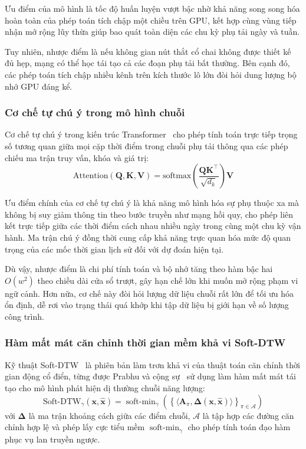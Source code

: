 Ưu điểm của mô hình là tốc độ huấn luyện vượt bậc nhờ khả năng song song hóa hoàn toàn của phép toán tích chập một chiều trên GPU, kết hợp cùng vùng tiếp nhận mở rộng lũy thừa giúp bao quát toàn diện các chu kỳ phụ tải ngày và tuần.

Tuy nhiên, nhược điểm là nếu không gian nút thắt cổ chai không được thiết kế đủ hẹp, mạng có thể học tái tạo cả các đoạn phụ tải bất thường. Bên cạnh đó, các phép toán tích chập nhiều kênh trên kích thước lô lớn đòi hỏi dung lượng bộ nhớ GPU đáng kể.

\subsubsection{Cơ chế tự chú ý trong mô hình chuỗi}

Cơ chế tự chú ý trong kiến trúc Transformer~\cite{transformer} cho phép tính toán trực tiếp trọng số tương quan giữa mọi cặp thời điểm trong chuỗi phụ tải thông qua các phép chiếu ma trận truy vấn, khóa và giá trị:
\begin{equation*}
    \text{Attention}(\mathbf{Q}, \mathbf{K}, \mathbf{V}) = \text{softmax}\left( \frac{\mathbf{Q}\mathbf{K}^\top}{\sqrt{d_k}} \right) \mathbf{V}
\end{equation*}

Ưu điểm chính của cơ chế tự chú ý là khả năng mô hình hóa sự phụ thuộc xa mà không bị suy giảm thông tin theo bước truyền như mạng hồi quy, cho phép liên kết trực tiếp giữa các thời điểm cách nhau nhiều ngày trong cùng một chu kỳ vận hành. Ma trận chú ý đồng thời cung cấp khả năng trực quan hóa mức độ quan trọng của các mốc thời gian lịch sử đối với dự đoán hiện tại.

Dù vậy, nhược điểm là chi phí tính toán và bộ nhớ tăng theo hàm bậc hai $O(w^2)$ theo chiều dài cửa sổ trượt, gây hạn chế lớn khi muốn mở rộng phạm vi ngữ cảnh. Hơn nữa, cơ chế này đòi hỏi lượng dữ liệu chuỗi rất lớn để tối ưu hóa ổn định, dễ rơi vào trạng thái quá khớp khi tập dữ liệu bị giới hạn về số lượng công trình.

\subsubsection{Hàm mất mát căn chỉnh thời gian mềm khả vi Soft-DTW}

Kỹ thuật Soft-DTW~\cite{soft_dtw} là phiên bản làm trơn khả vi của thuật toán căn chỉnh thời gian động cổ điển, từng được Prabhu và cộng sự~\cite{prabhu2024} sử dụng làm hàm mất mát tái tạo cho mô hình phát hiện dị thường chuỗi năng lượng:
\begin{equation*}
    \text{Soft-DTW}_\gamma(\mathbf{x}, \hat{\mathbf{x}}) = \operatorname{soft-min}_\gamma \left( \left\{ \langle \mathbf{A}_\pi, \boldsymbol{\Delta}(\mathbf{x}, \hat{\mathbf{x}}) \rangle \right\}_{\pi \in \mathcal{A}} \right)
\end{equation*}
với $\boldsymbol{\Delta}$ là ma trận khoảng cách giữa các điểm chuỗi, $\mathcal{A}$ là tập hợp các đường căn chỉnh hợp lệ và phép lấy cực tiểu mềm $\operatorname{soft-min}_\gamma$ cho phép tính toán đạo hàm phục vụ lan truyền ngược.

